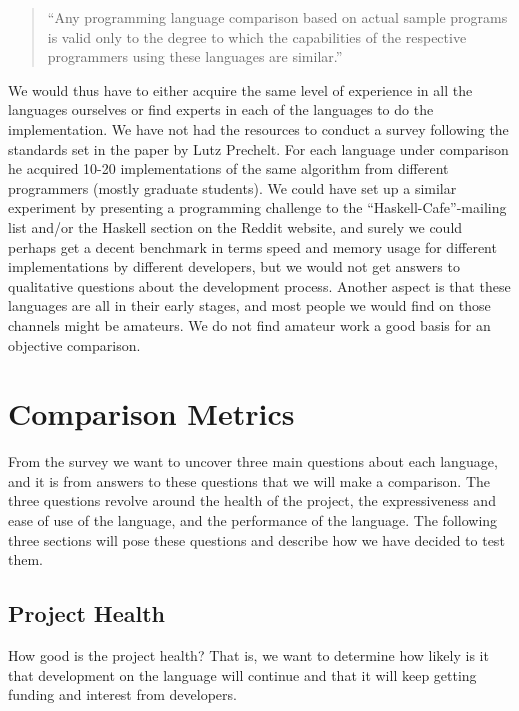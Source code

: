\begin{quote}
  ``Any programming language comparison based on actual sample programs
  is valid only to the degree to which the capabilities of the
  respective programmers using these languages are similar.''
\end{quote}

We would thus have to either acquire the same level of experience in all the
languages ourselves or find experts in each of the languages to do the
implementation. We have not had the resources to conduct a survey
following the standards set in the paper by Lutz Prechelt. For each
language under comparison he acquired 10-20 implementations of the
same algorithm from different programmers (mostly graduate
students). We could have set up a similar experiment by presenting a
programming challenge to the ``Haskell-Cafe''-mailing list and/or the
Haskell section on the Reddit website, and surely we could perhaps get
a decent benchmark in terms speed and memory usage for different
implementations by different developers, but we would not get answers
to qualitative questions about the development process. Another aspect
is that these languages are all in their early stages, and most people
we would find on those channels might be amateurs. We do not find
amateur work a good basis for an objective comparison.


\section{Comparison Metrics}
From the survey we want to uncover three main questions about each
language, and it is from answers to these questions that we will make
a comparison. The three questions revolve around the health of
the project, the expressiveness and ease of use of the language, and the
performance of the language. The following three sections will pose
these questions and describe how we have decided to test them.

\subsection{Project Health}

How good is the project health? That is, we want to determine how likely is it
that development on the language will continue and that it will keep getting
funding and interest from developers.

